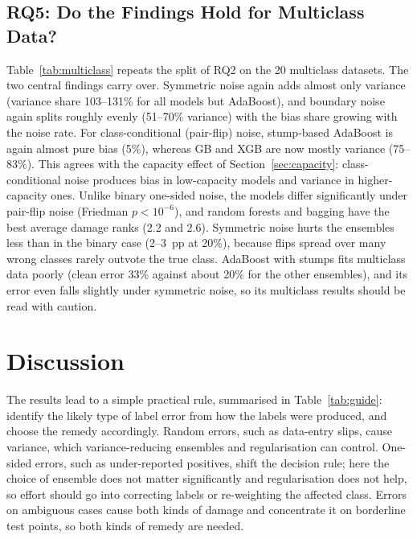 \documentclass[conference,a4paper]{IEEEtran}
\begin{document}
\subsection{RQ5: Do the Findings Hold for Multiclass Data?}
Table~\ref{tab:multiclass} repeats the split of RQ2 on the 20 multiclass datasets. The two central findings carry over. Symmetric noise again adds almost only variance (variance share 103--131\% for all models but AdaBoost), and boundary noise again splits roughly evenly (51--70\% variance) with the bias share growing with the noise rate. For class-conditional (pair-flip) noise, stump-based AdaBoost is again almost pure bias (5\%), whereas GB and XGB are now mostly variance (75--83\%). This agrees with the capacity effect of Section~\ref{sec:capacity}: class-conditional noise produces bias in low-capacity models and variance in higher-capacity ones. Unlike binary one-sided noise, the models differ significantly under pair-flip noise (Friedman $p<10^{-6}$), and random forests and bagging have the best average damage ranks (2.2 and 2.6). Symmetric noise hurts the ensembles less than in the binary case (2--3~pp at 20\%), because flips spread over many wrong classes rarely outvote the true class. AdaBoost with stumps fits multiclass data poorly (clean error 33\% against about 20\% for the other ensembles), and its error even falls slightly under symmetric noise, so its multiclass results should be read with caution.

\begin{table}[!t]
\caption{Multiclass Datasets: Damage at 20\% Noise (pp) and Share Due to Variance}
\label{tab:multiclass}
\centering
\footnotesize
\setlength{\tabcolsep}{4pt}

\end{table}

\section{Discussion}
The results lead to a simple practical rule, summarised in Table~\ref{tab:guide}: identify the likely type of label error from how the labels were produced, and choose the remedy accordingly. Random errors, such as data-entry slips, cause variance, which variance-reducing ensembles and regularisation can control. One-sided errors, such as under-reported positives, shift the decision rule; here the choice of ensemble does not matter significantly and regularisation does not help, so effort should go into correcting labels or re-weighting the affected class. Errors on ambiguous cases cause both kinds of damage and concentrate it on borderline test points, so both kinds of remedy are needed.
\end{document}
